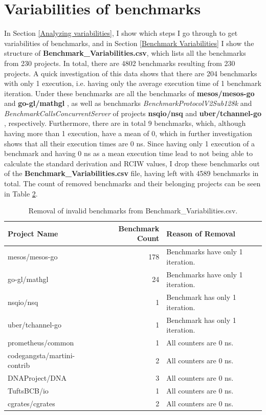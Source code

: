 \documentclass{seal_thesis}
\begin{document}
\section{Variabilities of benchmarks}
\label{Variabilities of benchmarks}

In Section \ref{Analyzing variabilities}, I show which steps I go through to get variabilities of benchmarks, and in Section \ref{Benchmark Variabilities} I show the structure of \textbf{Benchmark\_Variabilities.csv}, which lists all the benchmarks from 230 projects. In total, there are 4802 benchmarks resulting from 230 projects. A quick investigation of this data shows that there are 204 benchmarks with only 1 execution, i.e. having only the average execution time of 1 benchmark iteration. Under these benchmarks are all the benchmarks of \textbf{mesos/mesos-go} \cite{mesos/mesos-go} and \textbf{go-gl/mathgl} \cite{go-gl/mathgl}, as well as benchmarks \textit{BenchmarkProtocolV2Sub128k} and \textit{BenchmarkCallsConcurrentServer} of projects \textbf{nsqio/nsq} \cite{nsqio/nsq} and \textbf{uber/tchannel-go} \cite{uber/tchannel-go}, respectively. Furthermore, there are in total 9 benchmarks, which, although having more than 1 execution, have a mean of 0, which in further investigation shows that all their execution times are 0 ns. Since having only 1 execution of a benchmark and having 0 ns as a mean execution time lead to not being able to calculate the standard derivation and RCIW values, I drop these benchmarks out of the \textbf{Benchmark\_Variabilities.csv} file, having left with 4589 benchmarks in total. The count of removed benchmarks and their belonging projects can be seen in Table \ref{removal1}.

\begin{table}[H]
\begin{longtable}[c]{@{}lrl@{}}
	\caption{Removal of invalid benchmarks from Benchmark\_Variabilities.csv.}
	\label{removal1}\\
	\toprule
	Project Name & Benchmark Count & Reason of Removal \\* \midrule
	\endfirsthead
	\endhead
	\bottomrule
	\endfoot
	\endlastfoot
	mesos/mesos-go & 178 & Benchmarks have only 1 iteration. \\
	go-gl/mathgl & 24 & Benchmarks have only 1 iteration. \\
	nsqio/nsq & 1 & Benchmark has only 1 iteration. \\
	uber/tchannel-go & 1 & Benchmark has only 1 iteration. \\
	prometheus/common & 1 & All counters are 0 ns. \\
	codegangsta/martini-contrib & 2 & All counters are 0 ns. \\
	DNAProject/DNA & 3 & All counters are 0 ns. \\
	TuftsBCB/io & 1 & All counters are 0 ns. \\
	cgrates/cgrates & 2 & All counters are 0 ns. \\* \bottomrule
\end{longtable}
\end{table}
\end{document}
